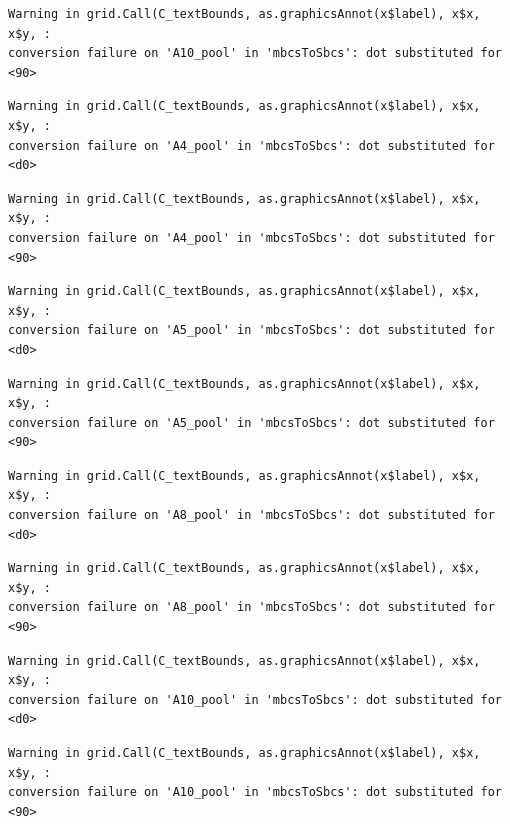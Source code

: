 \documentclass[
  letterpaper,
  DIV=11,
  numbers=noendperiod]{scrartcl}
\begin{document}
\begin{verbatim}
Warning in grid.Call(C_textBounds, as.graphicsAnnot(x$label), x$x, x$y, :
conversion failure on 'А10_pool' in 'mbcsToSbcs': dot substituted for <90>
\end{verbatim}

\begin{verbatim}
Warning in grid.Call(C_textBounds, as.graphicsAnnot(x$label), x$x, x$y, :
conversion failure on 'А4_pool' in 'mbcsToSbcs': dot substituted for <d0>
\end{verbatim}

\begin{verbatim}
Warning in grid.Call(C_textBounds, as.graphicsAnnot(x$label), x$x, x$y, :
conversion failure on 'А4_pool' in 'mbcsToSbcs': dot substituted for <90>
\end{verbatim}

\begin{verbatim}
Warning in grid.Call(C_textBounds, as.graphicsAnnot(x$label), x$x, x$y, :
conversion failure on 'А5_pool' in 'mbcsToSbcs': dot substituted for <d0>
\end{verbatim}

\begin{verbatim}
Warning in grid.Call(C_textBounds, as.graphicsAnnot(x$label), x$x, x$y, :
conversion failure on 'А5_pool' in 'mbcsToSbcs': dot substituted for <90>
\end{verbatim}

\begin{verbatim}
Warning in grid.Call(C_textBounds, as.graphicsAnnot(x$label), x$x, x$y, :
conversion failure on 'А8_pool' in 'mbcsToSbcs': dot substituted for <d0>
\end{verbatim}

\begin{verbatim}
Warning in grid.Call(C_textBounds, as.graphicsAnnot(x$label), x$x, x$y, :
conversion failure on 'А8_pool' in 'mbcsToSbcs': dot substituted for <90>
\end{verbatim}

\begin{verbatim}
Warning in grid.Call(C_textBounds, as.graphicsAnnot(x$label), x$x, x$y, :
conversion failure on 'А10_pool' in 'mbcsToSbcs': dot substituted for <d0>
\end{verbatim}

\begin{verbatim}
Warning in grid.Call(C_textBounds, as.graphicsAnnot(x$label), x$x, x$y, :
conversion failure on 'А10_pool' in 'mbcsToSbcs': dot substituted for <90>
\end{verbatim}
\end{document}
